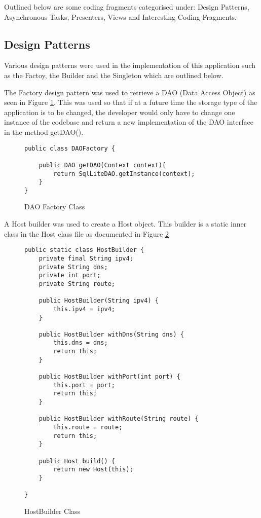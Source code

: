 Outlined below are some coding fragments categorised under: Design Patterns, Asynchronous Tasks, Presenters, Views and Interesting Coding Fragments.

\tocless\subsection{Design Patterns}
Various design patterns were used in the implementation of this application such as the Factoy, the Builder and the Singleton which are outlined below.

The Factory design pattern was used to retrieve a DAO (Data Access Object) as seen in Figure \ref{lst:daoFactory}.
This was used so that if at a future time the storage type of the application is to be changed, the developer would only have to change one instance of the codebase and return a new implementation of the DAO interface in the method getDAO().
\begin{figure}[h]
\caption{DAO Factory Class}
\label{lst:daoFactory}
\begin{lstlisting}[style=Java]
public class DAOFactory {

    public DAO getDAO(Context context){
        return SqlLiteDAO.getInstance(context);
    }
}
\end{lstlisting}
\end{figure}

A Host builder was used to create a Host object.
This builder is a static inner class in the Host class file as documented in Figure \ref{lst:hostBuilder}
\begin{figure}[h]
\caption{HostBuilder Class}
\label{lst:hostBuilder}
\begin{lstlisting}[style=Java]
public static class HostBuilder {
    private final String ipv4;
    private String dns;
    private int port;
    private String route;

    public HostBuilder(String ipv4) {
        this.ipv4 = ipv4;
    }

    public HostBuilder withDns(String dns) {
        this.dns = dns;
        return this;
    }

    public HostBuilder withPort(int port) {
        this.port = port;
        return this;
    }

    public HostBuilder withRoute(String route) {
        this.route = route;
        return this;
    }

    public Host build() {
        return new Host(this);
    }

}
\end{lstlisting}
\end{figure}

